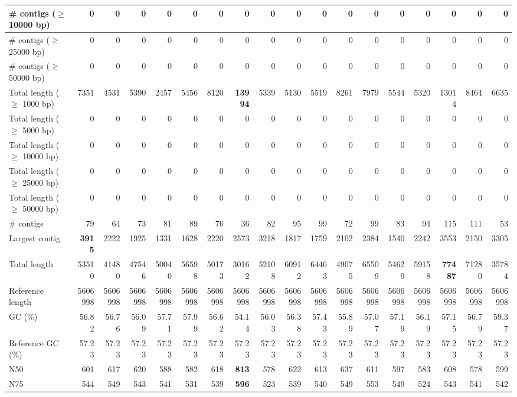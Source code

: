 \documentclass[12pt,a4paper]{article}
\begin{document}
\begin{table}[ht]
\begin{center}
\begin{tabular}{|l*{17}{|r}|}
\# contigs ($\geq$ 10000 bp) & 0 & 0 & 0 & 0 & 0 & 0 & 0 & 0 & 0 & 0 & 0 & 0 & 0 & 0 & 0 & 0 & 0 \\ \hline
\# contigs ($\geq$ 25000 bp) & 0 & 0 & 0 & 0 & 0 & 0 & 0 & 0 & 0 & 0 & 0 & 0 & 0 & 0 & 0 & 0 & 0 \\ \hline
\# contigs ($\geq$ 50000 bp) & 0 & 0 & 0 & 0 & 0 & 0 & 0 & 0 & 0 & 0 & 0 & 0 & 0 & 0 & 0 & 0 & 0 \\ \hline
Total length ($\geq$ 1000 bp) & 7351 & 4531 & 5390 & 2457 & 5456 & 8120 & {\bf 13994} & 5339 & 5130 & 5519 & 8261 & 7979 & 5544 & 5320 & 13014 & 8464 & 6635 \\ \hline
Total length ($\geq$ 5000 bp) & 0 & 0 & 0 & 0 & 0 & 0 & 0 & 0 & 0 & 0 & 0 & 0 & 0 & 0 & 0 & 0 & 0 \\ \hline
Total length ($\geq$ 10000 bp) & 0 & 0 & 0 & 0 & 0 & 0 & 0 & 0 & 0 & 0 & 0 & 0 & 0 & 0 & 0 & 0 & 0 \\ \hline
Total length ($\geq$ 25000 bp) & 0 & 0 & 0 & 0 & 0 & 0 & 0 & 0 & 0 & 0 & 0 & 0 & 0 & 0 & 0 & 0 & 0 \\ \hline
Total length ($\geq$ 50000 bp) & 0 & 0 & 0 & 0 & 0 & 0 & 0 & 0 & 0 & 0 & 0 & 0 & 0 & 0 & 0 & 0 & 0 \\ \hline
\# contigs & 79 & 64 & 73 & 81 & 89 & 76 & 36 & 82 & 95 & 99 & 72 & 99 & 83 & 94 & 115 & 111 & 53 \\ \hline
Largest contig & {\bf 3915} & 2222 & 1925 & 1331 & 1628 & 2220 & 2573 & 3218 & 1817 & 1759 & 2102 & 2384 & 1540 & 2242 & 3553 & 2150 & 3305 \\ \hline
Total length & 53510 & 41480 & 47546 & 50040 & 56598 & 50173 & 30162 & 52108 & 60912 & 64463 & 49075 & 65509 & 54629 & 59158 & {\bf 77487} & 71280 & 35784 \\ \hline
Reference length & 5606998 & 5606998 & 5606998 & 5606998 & 5606998 & 5606998 & 5606998 & 5606998 & 5606998 & 5606998 & 5606998 & 5606998 & 5606998 & 5606998 & 5606998 & 5606998 & 5606998 \\ \hline
GC (\%) & 56.82 & 56.76 & 56.09 & 57.71 & 57.99 & 56.62 & 54.14 & 56.03 & 56.38 & 57.43 & 55.89 & 57.07 & 57.19 & 56.19 & 57.15 & 56.79 & 59.37 \\ \hline
Reference GC (\%) & 57.23 & 57.23 & 57.23 & 57.23 & 57.23 & 57.23 & 57.23 & 57.23 & 57.23 & 57.23 & 57.23 & 57.23 & 57.23 & 57.23 & 57.23 & 57.23 & 57.23 \\ \hline
N50 & 601 & 617 & 620 & 588 & 582 & 618 & {\bf 813} & 578 & 622 & 613 & 637 & 611 & 597 & 583 & 608 & 578 & 599 \\ \hline
N75 & 544 & 549 & 543 & 541 & 531 & 539 & {\bf 596} & 523 & 539 & 540 & 549 & 553 & 549 & 524 & 543 & 541 & 542 \\ \hline

\end{tabular}
\end{center}
\end{table}
\end{document}

